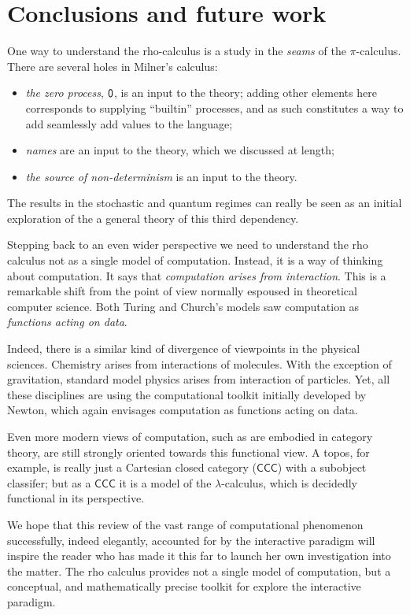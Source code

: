 \section{Conclusions and future work}

One way to understand the rho-calculus is a study in the \emph{seams}
of the $\pi$-calculus. There are several holes in Milner's calculus:

\begin{itemize}
  \item \emph{the zero process}, $\mathsf{0}$, is an input to the theory;
    adding other elements here corresponds to supplying ``builtin''
    processes, and as such constitutes a way to add seamlessly add
    values to the language;
  \item \emph{names} are an input to the theory, which we discussed at length;
  \item \emph{the source of non-determinism} is an input to the theory.
\end{itemize}

The results in the stochastic and quantum regimes can really be seen
as an initial exploration of the a general theory of this third
dependency.

Stepping back to an even wider perspective we need to understand the
rho calculus not as a single model of computation. Instead, it is a
way of thinking about computation. It says that \emph{computation
  arises from interaction}. This is a remarkable shift from the point
of view normally espoused in theoretical computer science. Both Turing
and Church's models saw computation as \emph{functions acting on
  data}.

Indeed, there is a similar kind of divergence of viewpoints in the
physical sciences. Chemistry arises from interactions of
molecules. With the exception of gravitation, standard model physics
arises from interaction of particles. Yet, all these disciplines are
using the computational toolkit initially developed by Newton, which
again envisages computation as functions acting on data.

Even more modern views of computation, such as are embodied in
category theory, are still strongly oriented towards this functional
view. A topos, for example, is really just a Cartesian closed category
($\mathsf{CCC}$) with a subobject classifer; but as a $\mathsf{CCC}$
it is a model of the $\lambda$-calculus, which is decidedly functional
in its perspective.

We hope that this review of the vast range of computational phenomenon
successfully, indeed elegantly, accounted for by the interactive
paradigm will inspire the reader who has made it this far to launch
her own investigation into the matter. The rho calculus provides not a
single model of computation, but a conceptual, and mathematically
precise toolkit for explore the interactive paradigm.

